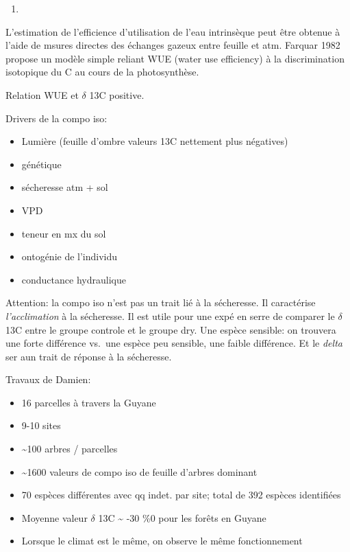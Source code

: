 \documentclass[
]{book}
\providecommand{\tightlist}{%
  \setlength{\itemsep}{0pt}\setlength{\parskip}{0pt}}
\begin{document}
\begin{enumerate}
\def\labelenumi{(\arabic{enumi})}
\tightlist
\item
\end{enumerate}

L'estimation de l'efficience d'utilisation de l'eau intrinsèque peut être obtenue à l'aide de msures directes des échanges gazeux entre feuille et atm. Farquar 1982 propose un modèle simple reliant WUE (water use efficiency) à la discrimination isotopique du C au cours de la photosynthèse.

Relation WUE et \(\delta\) 13C positive.

Drivers de la compo iso:

\begin{itemize}
\tightlist
\item
  Lumière (feuille d'ombre valeurs 13C nettement plus négatives)
\item
  génétique
\item
  sécheresse atm + sol
\item
  VPD
\item
  teneur en mx du sol
\item
  ontogénie de l'individu
\item
  conductance hydraulique
\end{itemize}

Attention: la compo iso n'est pas un trait lié à la sécheresse. Il caractérise \emph{l'acclimation} à la sécheresse. Il est utile pour une expé en serre de comparer le \(\delta\) 13C entre le groupe controle et le groupe dry. Une espèce sensible: on trouvera une forte différence vs.~une espèce peu sensible, une faible différence. Et le \emph{delta} ser aun trait de réponse à la sécheresse.

Travaux de Damien:

\begin{itemize}
\tightlist
\item
  16 parcelles à travers la Guyane
\item
  9-10 sites\\
\item
  \textasciitilde100 arbres / parcelles
\item
  \textasciitilde1600 valeurs de compo iso de feuille d'arbres dominant
\item
  70 espèces différentes avec qq indet. par site; total de 392 espèces identifiées
\item
  Moyenne valeur \(\delta\) 13C \textasciitilde{} -30 \%0 pour les forêts en Guyane
\item
  Lorsque le climat est le même, on observe le même fonctionnement
\end{itemize}
\end{document}
